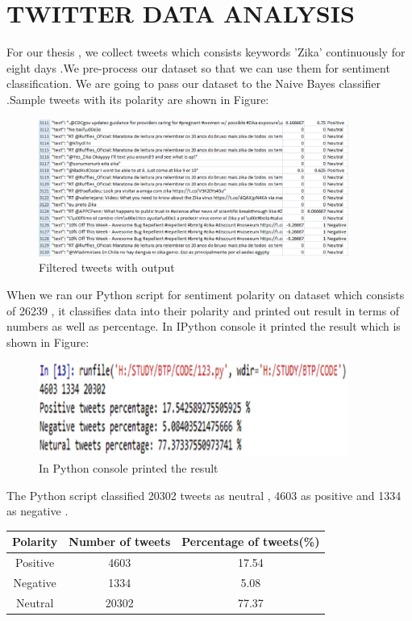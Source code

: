 \section{TWITTER  DATA ANALYSIS }
For our thesis , we collect tweets which consists keywords 'Zika'  continuously  for eight days .We pre-process our dataset so that we can use them for sentiment classification. We are going to pass our dataset to the Naive Bayes  classifier .Sample tweets with its polarity are  shown in Figure:
 \begin{figure}[h]
\label{ftw}
\centerline{\includegraphics[width=4in]{ftw}}
\caption{Filtered tweets with output}
\end{figure}
When we ran our Python script for sentiment polarity on dataset which consists of 26239 , it classifies data into their  polarity and printed out result in terms of numbers as well as percentage. In IPython console it  printed the result which is shown in Figure:  
 \begin{figure}[h]
\label{ut1}
\centerline{\includegraphics[width=4in]{ut1}}
\caption{In Python console printed the result }
\end{figure}
The Python script classified 20302 tweets as neutral , 4603 as positive and 1334  as negative . 
\begin{table}
 \begin{tabular}{|c c c|}
 \hline
 Polarity & Number of tweets & Percentage of tweets(\%) \\ 
 \hline
 Positive & 4603 & 17.54 \\
 \hline
 Negative & 1334 & 5.08 \\
 \hline
 Neutral & 20302 & 77.37 \\ 
 \hline
\end{tabular}
\end{table}
